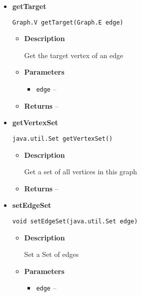 {{{{{\begin{itemize}
{\begin{itemize}
{Get the source vertex of an edge
}
\item{
{\bf  Parameters}
  \begin{itemize}
   \item{
\texttt{edge} -- }
  \end{itemize}
}%
\item{{\bf  Returns} -- 
 
}%
\end{itemize}
}%
\item{ 
{\bf  getTarget}\\
\begin{lstlisting}[frame=none]
Graph.V getTarget(Graph.E edge)\end{lstlisting} %
\begin{itemize}
\item{
{\bf  Description}

Get the target vertex of an edge
}
\item{
{\bf  Parameters}
  \begin{itemize}
   \item{
\texttt{edge} -- }
  \end{itemize}
}%
\item{{\bf  Returns} -- 
 
}%
\end{itemize}
}%
\item{ 
{\bf  getVertexSet}\\
\begin{lstlisting}[frame=none]
java.util.Set getVertexSet()\end{lstlisting} %
\begin{itemize}
\item{
{\bf  Description}

Get a set of all vertices in this graph
}
\item{{\bf  Returns} -- 
 
}%
\end{itemize}
}%
\item{ 
{\bf  setEdgeSet}\\
\begin{lstlisting}[frame=none]
void setEdgeSet(java.util.Set edge)\end{lstlisting} %
\begin{itemize}
\item{
{\bf  Description}

Set a Set of edges
}
\item{
{\bf  Parameters}
  \begin{itemize}
   \item{
\texttt{edge} -- }
  \end{itemize}
}%
\end{itemize}
}%
\end{itemize}
}
}
}}}
